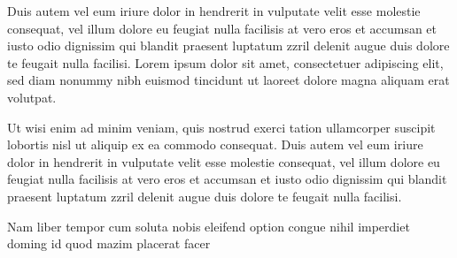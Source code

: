 Duis autem vel eum iriure dolor in hendrerit in vulputate velit esse molestie consequat, vel illum dolore eu feugiat nulla facilisis at vero eros et accumsan et iusto odio dignissim qui blandit praesent luptatum zzril delenit augue duis dolore te feugait nulla facilisi. Lorem ipsum dolor sit amet, consectetuer adipiscing elit, sed diam nonummy nibh euismod tincidunt ut laoreet dolore magna aliquam erat volutpat.   

Ut wisi enim ad minim veniam, quis nostrud exerci tation ullamcorper suscipit lobortis nisl ut aliquip ex ea commodo consequat. Duis autem vel eum iriure dolor in hendrerit in vulputate velit esse molestie consequat, vel illum dolore eu feugiat nulla facilisis at vero eros et accumsan et iusto odio dignissim qui blandit praesent luptatum zzril delenit augue duis dolore te feugait nulla facilisi.   

Nam liber tempor cum soluta nobis eleifend option congue nihil imperdiet doming id quod mazim placerat facer
